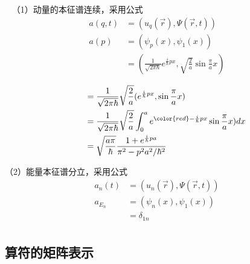 \begin{frame} [allowframebreaks=]
    \解~ （1）动量的本征谱连续，采用公式\\
    \begin{equation*}
        \begin{split}
            a(q,t)&=(u_q(\vec{r}), \Psi(\vec{r},t)) \\
            a(p)&= (\psi_{p}(x), \psi_1(x))\\
            &= (\frac{1}{\sqrt{2\pi\hbar}}e^{\frac{i}{\hbar}px}, \sqrt{\frac{2}{a}} \sin \frac{\pi}{a}x)
        \end{split} 
    \end{equation*}

    \begin{equation*}
        \begin{split}
          ~~~~~~&= \frac{1}{\sqrt{2\pi\hbar}}\sqrt{\frac{2}{a}} (e^{\frac{i}{\hbar}px},  \sin \frac{\pi}{a}x)\\
            &= \frac{1}{\sqrt{2\pi\hbar}}\sqrt{\frac{2}{a}} \int_0 ^a e^{{\color{red}-}\frac{i}{\hbar}px}\sin \frac{\pi}{a}x) dx\\
            &=\sqrt{\frac{a\pi}{\hbar}} \frac{1+e^{\frac{i}{\hbar}pa}}{\pi^2-p^2a^2/\hbar^2}
        \end{split} 
    \end{equation*}

    （2）能量本征谱分立，采用公式\\
    \begin{equation*}
        \begin{split}
            a_n(t)&=(u_n(\vec{r}), \Psi(\vec{r},t)) \\
            a_{E_n}&=(\psi_n(x), \psi_1(x)) \\
            &=\delta_{1n} \\
        \end{split} 
    \end{equation*}  
\end{frame} 

\subsection{算符的矩阵表示}

